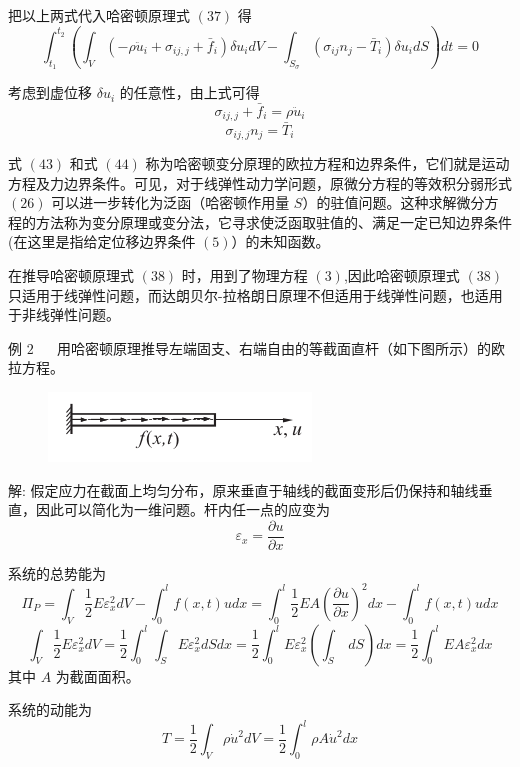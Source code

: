 \documentclass[12pt,a4paper]{article}
\begin{document}
把以上两式代入哈密顿原理式 $(37)$ 得
$$
\int_{t_1}^{t_2}\left(\int_{V}(-\rho\ddot{u}_i+\sigma_{ij,j}+\bar{f}_i)\delta u_idV-\int_{S_{\sigma}}(\sigma_{ij}n_j-\bar{T}_i)\delta u_idS\right)dt=0
$$

考虑到虚位移 $\delta u_i$ 的任意性，由上式可得
\begin{equation}
\sigma_{ij,j}+\bar{f}_i=\rho\ddot{u}_i
\end{equation}
\begin{equation}
\sigma_{ij,j}n_j=\bar{T}_i
\end{equation}

式 $(43)$ 和式 $(44)$ 称为哈密顿变分原理的欧拉方程和边界条件，它们就是运动方程及力边界条件。可见，对于线弹性动力学问题，原微分方程的等效积分弱形式 $(26)$ 可以进一步转化为泛函（哈密顿作用量 $S$）的驻值问题。这种求解微分方程的方法称为变分原理或变分法，它寻求使泛函取驻值的、满足一定已知边界条件 (在这里是指给定位移边界条件 $(5)$）的未知函数。

在推导哈密顿原理式 $(38)$ 时，用到了物理方程 $(3)$,因此哈密顿原理式 $(38)$ 只适用于线弹性问题，而达朗贝尔-拉格朗日原理不但适用于线弹性问题，也适用于非线弹性问题。

例 $2$ ~~ 用哈密顿原理推导左端固支、右端自由的等截面直杆（如下图所示）的欧拉方程。

\begin{figure}[H]
\centering
\includegraphics[scale=0.6]{./figures/6.png}
\caption{}
\end{figure}

解: 假定应力在截面上均匀分布，原来垂直于轴线的截面变形后仍保持和轴线垂直，因此可以简化为一维问题。杆内任一点的应变为
$$
\varepsilon_x=\frac{\partial u}{\partial x}
$$

系统的总势能为
\begin{equation}
\Pi _P=\int_{V}\frac{1}{2}E\varepsilon^2_xdV-\int_{0}^{l}f(x,t)udx=\int_{0}^{l}\frac{1}{2}EA(\frac{\partial u}{\partial x})^2dx-\int_{0}^{l}f(x,t)udx
\end{equation}
$$
\int_{V}\frac{1}{2}E\varepsilon^2_xdV=\frac{1}{2}\int_{0}^{l}\int_{S}E\varepsilon^2_xdSdx=\frac{1}{2}\int_{0}^{l}E\varepsilon^2_x\left(\int_{S}~dS\right)dx=\frac{1}{2}\int_{0}^{l}EA\varepsilon^2_xdx
$$
其中 $A$ 为截面面积。

系统的动能为
$$
T=\frac{1}{2}\int_{V}\rho\dot{u}^2dV=\frac{1}{2}\int_{0}^{l}\rho A\dot{u}^2dx
$$
\end{document}
